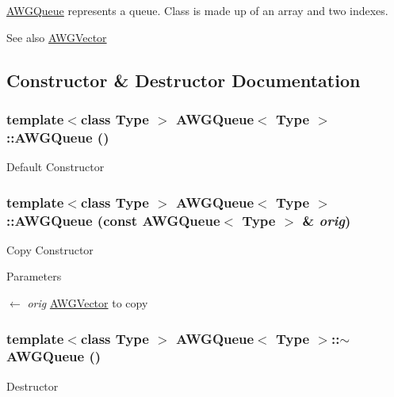 \hyperlink{classAWGQueue}{AWGQueue} represents a queue. Class is made up of an array and two indexes.

\begin{DoxySeeAlso}{See also}
\hyperlink{classAWGVector}{AWGVector} 
\end{DoxySeeAlso}


\subsection{Constructor \& Destructor Documentation}
\hypertarget{classAWGQueue_acc697a692098f14f933e70318639bab2}{
\subsubsection[{AWGQueue}]{\setlength{\rightskip}{0pt plus 5cm}template$<$class Type $>$ {\bf AWGQueue}$<$ Type $>$::{\bf AWGQueue} ()}}
\label{classAWGQueue_acc697a692098f14f933e70318639bab2}
Default Constructor \hypertarget{classAWGQueue_ac0a6aa6cd1e1681c5b2ccc577095e56c}{
\subsubsection[{AWGQueue}]{\setlength{\rightskip}{0pt plus 5cm}template$<$class Type $>$ {\bf AWGQueue}$<$ Type $>$::{\bf AWGQueue} (const {\bf AWGQueue}$<$ Type $>$ \& {\em orig})}}
\label{classAWGQueue_ac0a6aa6cd1e1681c5b2ccc577095e56c}
Copy Constructor


\begin{DoxyParams}{Parameters}
\item[\mbox{$\leftarrow$} {\em orig}]\hyperlink{classAWGVector}{AWGVector} to copy \end{DoxyParams}
\hypertarget{classAWGQueue_ae7b463f710e30740339f63247e76a207}{
\subsubsection[{$\sim$AWGQueue}]{\setlength{\rightskip}{0pt plus 5cm}template$<$class Type $>$ {\bf AWGQueue}$<$ Type $>$::$\sim${\bf AWGQueue} ()}}
\label{classAWGQueue_ae7b463f710e30740339f63247e76a207}
Destructor 

